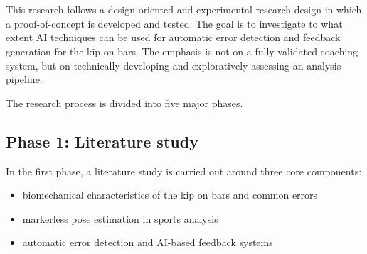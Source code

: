 
\chapter{}%
\label{ch:methodologie}

This research follows a design-oriented and experimental research design in which a proof-of-concept is developed and tested. The goal is to investigate to what extent AI techniques can be used for automatic error detection and feedback generation for the kip on bars. The emphasis is not on a fully validated coaching system, but on technically developing and exploratively assessing an analysis pipeline.

The research process is divided into five major phases.

\section{Phase 1: Literature study}

In the first phase, a literature study is carried out around three core components: 

\begin{itemize}
    \item biomechanical characteristics of the kip on bars and common errors
    \item markerless pose estimation in sports analysis
    \item automatic error detection and AI-based feedback systems
\end{itemize}

